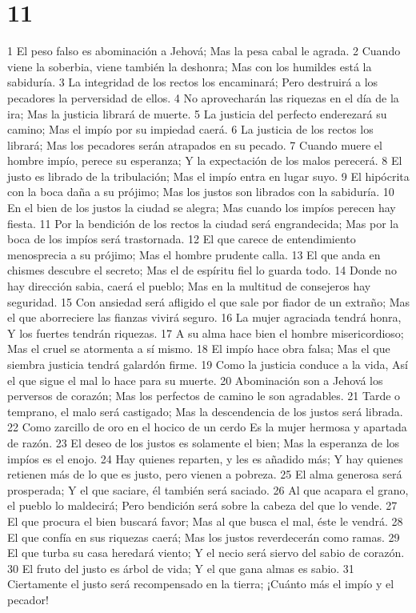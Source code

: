 \chapter{11}

1 El peso falso es abominación a Jehová;
Mas la pesa cabal le agrada.
2 Cuando viene la soberbia, viene también la deshonra;
Mas con los humildes está la sabiduría.
3 La integridad de los rectos los encaminará;
Pero destruirá a los pecadores la perversidad de ellos.
4 No aprovecharán las riquezas en el día de la ira;
Mas la justicia librará de muerte.
5 La justicia del perfecto enderezará su camino;
Mas el impío por su impiedad caerá.
6 La justicia de los rectos los librará;
Mas los pecadores serán atrapados en su pecado.
7 Cuando muere el hombre impío, perece su esperanza;
Y la expectación de los malos perecerá.
8 El justo es librado de la tribulación;
Mas el impío entra en lugar suyo.
9 El hipócrita con la boca daña a su prójimo;
Mas los justos son librados con la sabiduría.
10 En el bien de los justos la ciudad se alegra;
Mas cuando los impíos perecen hay fiesta.
11 Por la bendición de los rectos la ciudad será engrandecida;
Mas por la boca de los impíos será trastornada.
12 El que carece de entendimiento menosprecia a su prójimo;
Mas el hombre prudente calla.
13 El que anda en chismes descubre el secreto;
Mas el de espíritu fiel lo guarda todo.
14 Donde no hay dirección sabia, caerá el pueblo;
Mas en la multitud de consejeros hay seguridad.
15 Con ansiedad será afligido el que sale por fiador de un extraño;
Mas el que aborreciere las fianzas vivirá seguro.
16 La mujer agraciada tendrá honra,
Y los fuertes tendrán riquezas.
17 A su alma hace bien el hombre misericordioso;
Mas el cruel se atormenta a sí mismo.
18 El impío hace obra falsa;
Mas el que siembra justicia tendrá galardón firme.
19 Como la justicia conduce a la vida,
Así el que sigue el mal lo hace para su muerte.
20 Abominación son a Jehová los perversos de corazón; 
Mas los perfectos de camino le son agradables.
21 Tarde o temprano, el malo será castigado;
Mas la descendencia de los justos será librada.
22 Como zarcillo de oro en el hocico de un cerdo
Es la mujer hermosa y apartada de razón.
23 El deseo de los justos es solamente el bien;
Mas la esperanza de los impíos es el enojo.
24 Hay quienes reparten, y les es añadido más;
Y hay quienes retienen más de lo que es justo, pero vienen a pobreza.
25 El alma generosa será prosperada;
Y el que saciare, él también será saciado.
26 Al que acapara el grano, el pueblo lo maldecirá;
Pero bendición será sobre la cabeza del que lo vende.
27 El que procura el bien buscará favor;
Mas al que busca el mal, éste le vendrá.
28 El que confía en sus riquezas caerá;
Mas los justos reverdecerán como ramas.
29 El que turba su casa heredará viento; 
Y el necio será siervo del sabio de corazón.
30 El fruto del justo es árbol de vida;
Y el que gana almas es sabio.
31 Ciertamente el justo será recompensado en la tierra;
¡Cuánto más el impío y el pecador!

